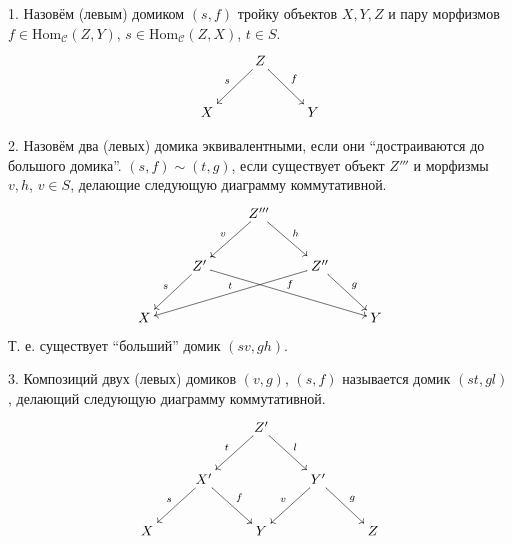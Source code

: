 \documentclass[../hw_main.tex]{subfiles}
\begin{document}
     \begin{to_def}
      1. Назовём (левым) домиком $(s, f)$ тройку объектов $X, Y, Z$ и пару морфизмов $f\in \text{Hom}_\mathcal{C}(Z, Y)$, $s \in \text{Hom}_\mathcal{C}(Z, X)$, $t\in S$.
      \begin{equation}\label{sample_home}
	\xymatrix{&Z \ar[ld]_s \ar[rd]^f&\\
	X&&Y}
      \end{equation}

      2. Назовём два (левых) домика эквивалентными, если они ``достраиваются до большого домика''. $(s, f)\sim (t, g)$, если существует объект $Z'''$ и морфизмы $v, h$, $v\in S$, делающие следующую диаграмму коммутативной.
      \begin{equation}\label{home_equivalence}
	\xymatrix{&&Z'''\ar[ld]_v\ar[rd]^h&&\\
	  &Z'\ar[ld]_s\ar[rrrd]^f&&Z''\ar[llld]_t\ar[rd]^g&\\
	X&&&&Y}
      \end{equation}
      Т. е. существует ``больший'' домик $(sv, gh)$.
      \label{homescapes}

      3. Композиций двух (левых) домиков $(v, g)$, $(s, f)$ называется домик $(st, gl)$, делающий следующую диаграмму коммутативной.
	\begin{equation}\label{home_composition}
	\xymatrix{&&Z'\ar[ld]_t\ar[rd]^l&&\\
	  &X'\ar[ld]_s\ar[rd]^f&&Y'\ar[ld]_v\ar[rd]^g&\\
	X&&Y&&Z}
      \end{equation}

    \end{to_def}
\end{document}
